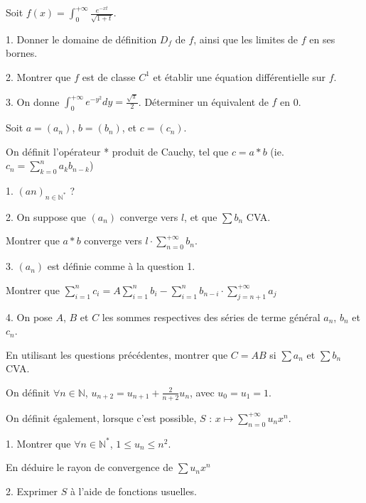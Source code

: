 \noindent Soit $\displaystyle f(x) = \int_{0}^{+\infty} \frac {e^{-xt}} {\sqrt{1+t}}$.

\vspace{5pt}
1. Donner le domaine de définition $D_f$ de $f$, ainsi que les limites de $f$ en ses bornes.

\vspace{5pt}
2. Montrer que $f$ est de classe $C^1$ et établir une équation différentielle sur $f$.

\vspace{5pt}
3. On donne $\displaystyle \int_{0}^{+\infty} {e^{-y^2}dy} = \frac {\sqrt{\pi}} {2}$.
Déterminer un équivalent de $f$ en 0.



\subetoiles



\noindent Soit $a = (a_n)$, $b = (b_n)$, et $c = (c_n)$.

\noindent On définit l'opérateur * produit de Cauchy, tel que $c = a * b$
(ie. $\displaystyle c_n = \sum_{k = 0}^{n} {a_kb_{n-k}}$)

\vspace{5pt}
1. $(an)_{n \in \mathbb{N}^*}$ ?

\vspace{5pt}
2. On suppose que $(a_n)$ converge vers $l$, et que $\sum b_n$ CVA.

Montrer que $a*b$ converge vers $\displaystyle l \cdot \sum_{n=0}^{+\infty}{b_n}$.

\vspace{5pt}
3. $(a_n)$ est définie comme à la question 1.

Montrer que $\displaystyle \sum_{i = 1}^{n} c_i = A \sum_{i = 1}^{n} b_i - \sum_{i = 1}^{n} b_{n-i} \cdot \sum_{j = n+1}^{+\infty} a_j$


\vspace{5pt}
4. On pose $A$, $B$ et $C$ les sommes respectives des séries de terme général $a_n$, $b_n$ et $c_n$.

En utilisant les questions précédentes, montrer que $C = AB$ si $\sum a_n$ et $\sum b_n$ CVA.



\subetoiles



\noindent On définit $\forall n \in \mathbb{N}$, $\displaystyle u_{n+2} = u_{n+1} + \frac {2} {n+2} u_n$,
avec $u_0 = u_1 = 1$.

\noindent On définit également, lorsque c'est possible, $S$ : $\displaystyle x \mapsto \sum_{n = 0}^{+\infty} {u_nx^n}$.

\vspace{5pt}
1. Montrer que $\forall n \in \mathbb{N}^*$, $1 \leqslant u_n \leqslant n^2$.

En déduire le rayon de convergence de $\sum u_nx^n$

\vspace{5pt}
2. Exprimer $S$ à l'aide de fonctions usuelles.



\subetoiles